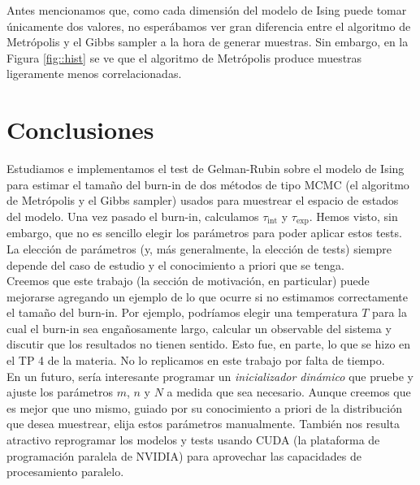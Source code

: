 \documentclass[a4paper, 12pt]{article}
\newcommand{\tauint}{\tau_\text{int}}
\newcommand{\tauexp}{\tau_\text{exp}}
\begin{document}
Antes mencionamos que, como cada dimensión del modelo de Ising puede tomar únicamente dos valores, no esperábamos ver gran diferencia entre el algoritmo de Metrópolis y el Gibbs sampler a la hora de generar muestras. Sin embargo, en la Figura \ref{fig::hist} se ve que el algoritmo de Metrópolis produce muestras ligeramente menos correlacionadas. 

\section{Conclusiones}

Estudiamos e implementamos el test de Gelman-Rubin sobre el modelo de Ising para estimar el tamaño del burn-in de dos métodos de tipo MCMC (el algoritmo de Metrópolis y el Gibbs sampler) usados para muestrear el espacio de estados del modelo. Una vez pasado el burn-in, calculamos $\tauint$ y $\tauexp$. Hemos visto, sin embargo, que no es sencillo elegir los parámetros para poder aplicar estos tests. La elección de parámetros (y, más generalmente, la elección de tests) siempre depende del caso de estudio y el conocimiento a priori que se tenga.\\

Creemos que este trabajo (la sección de motivación, en particular) puede mejorarse agregando un ejemplo de lo que ocurre si no estimamos correctamente el tamaño del burn-in. Por ejemplo, podríamos elegir una temperatura $T$ para la cual el burn-in sea engañosamente largo, calcular un observable del sistema y discutir que los resultados no tienen sentido. Esto fue, en parte, lo que se hizo en el TP 4 de la materia. No lo replicamos en este trabajo por falta de tiempo.\\

En un futuro, sería interesante programar un {\it inicializador dinámico} que pruebe y ajuste los parámetros $m$, $n$ y $N$ a medida que sea necesario. Aunque creemos que es mejor que uno mismo, guiado por su conocimiento a priori de la distribución que desea muestrear, elija estos parámetros manualmente. También nos resulta atractivo reprogramar los modelos y tests usando CUDA (la plataforma de programación paralela de NVIDIA) para aprovechar las capacidades de procesamiento paralelo.

\printbibliography
\end{document}
